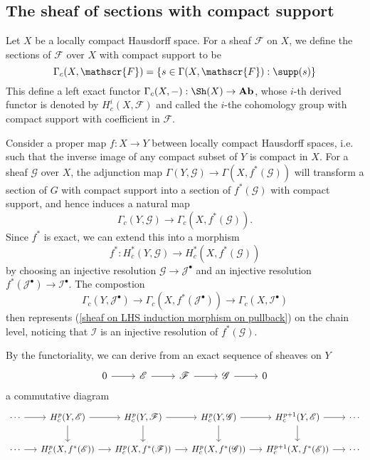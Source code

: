 \subsection{The sheaf of sections with compact support}
Let $X$ be a locally compact Hausdorff space. For a sheaf $\mathscr{F}$ on $X$, we define the sections of $\mathscr{F}$ over $X$ with compact support to be
\[\Gamma_c(X,\mathscr{F})=\{s\in\Gamma(X,\mathscr{F}):\text{$\supp(s)$}\}\]
This define a left exact functor $\Gamma_c(X,-):\Sh(X)\to\mathbf{Ab}$, whose $i$-th derived functor is denoted by $H_c^i(X,\mathscr{F})$ and called the $i$-the cohomology group with compact support with coefficient in $\mathscr{F}$.\par
Consider a proper map $f:X\to Y$ between locally compact Hausdorff spaces, i.e. such that the inverse image of any compact subset of $Y$ is compact in $X$. For a sheaf $\mathscr{G}$ over $X$, the adjunction map $\Gamma(Y,\mathscr{G})\to \Gamma(X,f^*(\mathscr{G}))$ will transform a section of $G$ with compact support into a section of $f^*(\mathscr{G})$ with compact support, and hence induces a natural map
\begin{equation}\label{sheaf on LHS induction morphism on pullback}
\Gamma_c(Y,\mathscr{G})\to\Gamma_c(X,f^*(\mathscr{G})).
\end{equation}
Since $f^*$ is exact, we can extend this into a morphism
\[f^*:H_c^*(Y,\mathscr{G})\to H_c^*(X,f^*(\mathscr{G}))\]
by choosing an injective resolution $\mathscr{G}\to\mathscr{J}^\bullet$ and an injective resolution $f^*(\mathscr{J}^\bullet)\to\mathscr{I}^\bullet$. The compostion
\[\Gamma_c(Y,\mathscr{J}^\bullet)\to \Gamma_c(X,f^*(\mathscr{J}^\bullet))\to\Gamma_c(X,\mathscr{I}^\bullet)\]
then represents (\ref{sheaf on LHS induction morphism on pullback}) on the chain level, noticing that $\mathscr{I}$ is an injective resolution of $f^*(\mathscr{G})$.\par
By the functoriality, we can derive from an exact sequence of sheaves on $Y$
\[\begin{tikzcd}
0\ar[r]&\mathscr{E}\ar[r]&\mathscr{F}\ar[r]&\mathscr{G}\ar[r]&0
\end{tikzcd}\]
a commutative diagram
\[\begin{tikzcd}[column sep=5mm]
\cdots\ar[r]&H^p_c(Y,\mathscr{E})\ar[r]\ar[d]&H^p_c(Y,\mathscr{F})\ar[r]\ar[d]&H^p_c(Y,\mathscr{G})\ar[r]\ar[d]&H^{p+1}_c(Y,\mathscr{E})\ar[d]\ar[r]&\cdots\\
\cdots\ar[r]&H^p_c(X,f^*(\mathscr{E}))\ar[r]&H^p_c(X,f^*(\mathscr{F}))\ar[r]&H^p_c(X,f^*(\mathscr{G}))\ar[r]&H^{p+1}_c(X,f^*(\mathscr{E}))\ar[r]&\cdots
\end{tikzcd}\]

